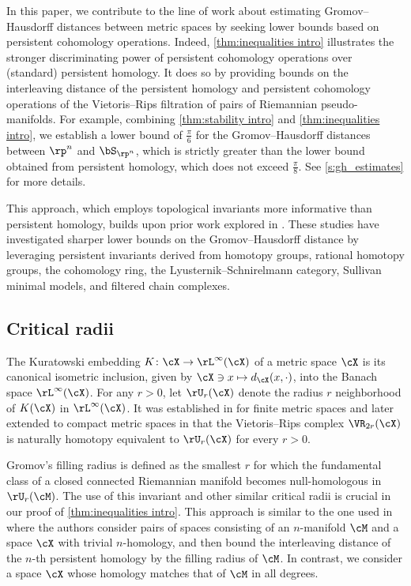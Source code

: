 In this paper, we contribute to the line of work about estimating Gromov--Hausdorff distances between metric spaces by seeking lower bounds based on persistent cohomology operations.
Indeed, \cref{thm:inequalities intro} illustrates the stronger discriminating power of persistent cohomology operations over (standard) persistent homology.
It does so by providing bounds on the interleaving distance of the persistent homology and persistent cohomology operations of the Vietoris--Rips filtration of pairs of Riemannian pseudo-manifolds.
For example, combining \cref{thm:stability intro} and \cref{thm:inequalities intro}, we establish a lower bound of $\frac{\pi}{6}$ for the Gromov--Hausdorff distances between \(\rp^n\) and \(\bS_{\rp^n}\), which is strictly greater than the lower bound obtained from persistent homology, which does not exceed $\frac{\pi}{8}$.
See \cref{s:gh_estimates} for more details.

This approach, which employs topological invariants more informative than persistent homology, builds upon prior work explored in \cite{zhou2023beyond, zhou2023persistent, memoli2024persistenthomotopy, memoli2024persistent, memoli2025ephemeral}.
These studies have investigated sharper lower bounds on the Gromov--Hausdorff distance by leveraging persistent invariants derived from homotopy groups, rational homotopy groups, the cohomology ring, the Lyusternik--Schnirelmann category, Sullivan minimal models, and filtered chain complexes.

\subsection*{Critical radii}

The Kuratowski embedding \(K \colon \cX \to \rL^\infty(\cX)\) of a metric space \(\cX\) is its canonical isometric inclusion, given by \(\cX \ni x \mapsto d_\cX(x,\cdot)\), into the Banach space $\rL^\infty(\cX)$.
For any $r>0$, let \(\rU_r(\cX)\) denote the radius \(r\) neighborhood of \(K(\cX)\) in \(\rL^\infty(\cX)\).
It was established in \cite{chazal2009gromov} for finite metric spaces and later extended to compact metric spaces in \cite{lim2024vietoris} that the Vietoris--Rips complex \(\VR_{2r}(\cX)\) is naturally homotopy equivalent to \(\rU_r(\cX)\) for every \(r > 0\).

Gromov's filling radius is defined as the smallest \(r\) for which the fundamental class of a closed connected Riemannian manifold becomes null-homologous in \(\rU_r(\cM)\).
The use of this invariant and other similar critical radii is crucial in our proof of \cref{thm:inequalities intro}.
This approach is similar to the one used in \cite[Prop.~9.38]{lim2024vietoris} where the authors consider pairs of spaces consisting of an $n$-manifold \(\cM\) and a space \(\cX\) with trivial \(n\)-homology, and then bound the interleaving distance of the \(n\)-th persistent homology by the filling radius of \(\cM\).
In contrast, we consider a space \(\cX\) whose homology matches that of \(\cM\) in all degrees.